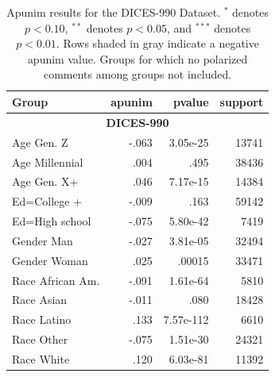 \documentclass[11pt]{article}
\theoremstyle{definition}
\theoremstyle{plain}
\begin{document}
\begin{table}[t]
	\centering
	\small 
	\begin{tabularx}{\columnwidth}{X r r r}
		\toprule
		\textbf{Group} & \textbf{apunim} & \textbf{pvalue} & \textbf{support} \\
		\midrule
		
		\multicolumn{4}{c}{\textbf{DICES-990}} \\
		\midrule
		\rowcolor{gray!15}
		Age Gen. Z & -.063 & 3.05e-25 & 13741 \\
		Age Millennial & .004 & .495 & 38436 \\
		Age Gen. X+ & .046 & 7.17e-15 & 14384 \\
		\rowcolor{gray!15}
		Ed=College + & -.009 & .163 & 59142 \\
		\rowcolor{gray!15}
		Ed=High school & -.075 & 5.80e-42 & 7419 \\
		\rowcolor{gray!15}
		Gender Man & -.027 & 3.81e-05 & 32494 \\
		Gender Woman & .025 & .00015 & 33471 \\
		\rowcolor{gray!15}
		Race African Am. & -.091 & 1.61e-64 & 5810 \\
		\rowcolor{gray!15}
		Race Asian & -.011 & .080 & 18428 \\
		Race Latino & .133 & 7.57e-112 & 6610 \\
		\rowcolor{gray!15}
		Race Other & -.075 & 1.51e-30 & 24321 \\
		Race White & .120 & 6.03e-81 & 11392 \\
		\bottomrule
	\end{tabularx}
	\caption{Apunim results for the DICES-990 Dataset. $^{*}$ denotes $p<0.10$, $^{**}$ denotes $p<0.05$, and $^{***}$ denotes $p<0.01$.  Rows shaded in gray indicate a negative $\text{apunim}$ value. Groups for which no polarized comments among groups not included.}
	\label{tab:dices990-full}
\end{table}
\end{document}
